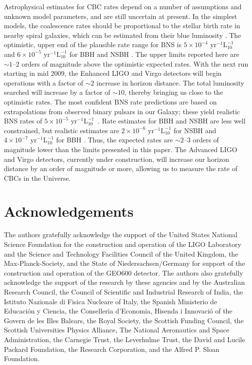 Astrophysical estimates for \ac{CBC} rates depend on a number of
assumptions and unknown model parameters, and are still uncertain at
present.  In the simplest models, the coalescence
rates should be proportional to the stellar birth rate in nearby spiral
galaxies, which can be estimated from their blue luminosity
\cite{LIGOS3S4Galaxies}.  The optimistic, upper end of the plausible
rate range for \ac{BNS} is $5 \times 10^{-4} \textrm{ yr}^{-1}
\mathrm{L}_{10}^{-1}$~\cite{Kalogera:2004tn, Kalogera:2004nt} and $6 \times
10^{-5} \textrm{ yr}^{-1} \mathrm{L}_{10}^{-1}$ for \ac{BBH} and \ac{NSBH}
\cite{Oshaughnessy:2008, OShaughnessy:2005}.  
The upper limits reported here are $\sim 1$--$2$ orders of
magnitude above the optimistic expected rates.  With the next run starting in mid 2009, the Enhanced \ac{LIGO} and Virgo
detectors will begin operations with a factor of $\sim 2$ increase in horizon
distance. The total luminosity searched will increase by a factor of $\sim
10$, thereby bringing us close to the optimistic rates.
The most confident \ac{BNS} rate predictions are based on extrapolations
from observed binary pulsars in our Galaxy; these yield realistic
\ac{BNS} rates of $5 \times 10^{-5} \textrm{ yr}^{-1} 
\mathrm{L}_{10}^{-1}$~\cite{Kalogera:2004tn, Kalogera:2004nt}.  Rate
estimates for \ac{BBH} and \ac{NSBH} are less well constrained, but
realistic estimates are $2 \times 10^{-6} \textrm{ yr}^{-1} 
\mathrm{L}_{10}^{-1}$ for \ac{NSBH} \cite{Oshaughnessy:2008} and $4
\times 10^{-7} \textrm{ yr}^{-1} \mathrm{L}_{10}^{-1}$ for \ac{BBH}
\cite{OShaughnessy:2005}.  Thus, the expected rates are $\sim 2$--$3$
orders of magnitude lower than the limits presented in this paper. The
Advanced LIGO and Virgo detectors, currently under construction, will
increase our horizon distance by an order of magnitude or more, allowing us to
measure the rate of CBCs in the Universe.

\section{Acknowledgements}
The authors gratefully acknowledge the support of the United States
National Science Foundation for the construction and operation of the
LIGO Laboratory and the Science and Technology Facilities Council of the
United Kingdom, the Max-Planck-Society, and the State of
Niedersachsen/Germany for support of the construction and operation of
the GEO600 detector. The authors also gratefully acknowledge the support
of the research by these agencies and by the Australian Research Council,
the Council of Scientific and Industrial Research of India, the Istituto
Nazionale di Fisica Nucleare of Italy, the Spanish Ministerio de
Educaci\'on y Ciencia, the Conselleria d'Economia, Hisenda i Innovaci\'o of
the Govern de les Illes Balears, the Royal Society, the Scottish Funding 
Council, the Scottish Universities Physics Alliance, The National Aeronautics 
and Space Administration, the Carnegie Trust, the Leverhulme Trust, the David
and Lucile Packard Foundation, the Research Corporation, and the Alfred
P. Sloan Foundation.


